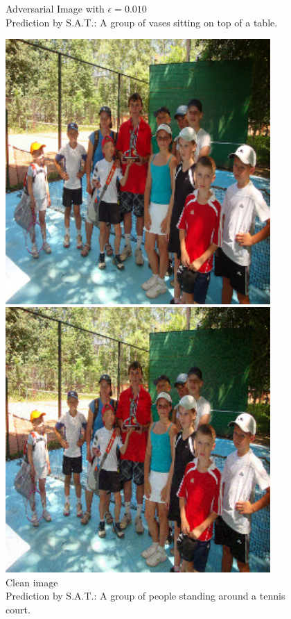 \begin{figure}[ht]
\begin{minipage}{0.45\textwidth}
        \caption*{Adversarial Image with $\epsilon=0.010$\\Prediction by S.A.T.: A group of vases sitting on top of a table.}
    \end{minipage}
\end{figure}

\begin{figure}[ht]
    \centering
    \begin{minipage}{0.45\textwidth}
        \centering
        \includegraphics[width=0.9\textwidth]{figures/fast_method_group_of_people/group_of_people_0.000.png} %
        \caption*{Clean image\\Prediction by S.A.T.: A group of people standing around a tennis court.}
    \end{minipage}\hfill
    \begin{minipage}{0.45\textwidth}
        \centering
        \includegraphics[width=0.9\textwidth]{figures/fast_method_group_of_people/group_of_people_0.020.png} %

\end{minipage}
\end{figure}
